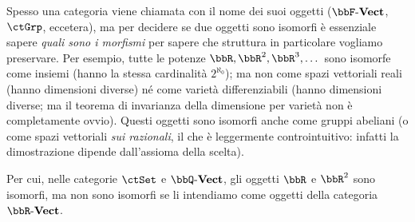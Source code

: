 \begin{warning}
	Spesso una categoria viene chiamata con il nome dei suoi oggetti (\(\ctVect\), \(\ctGrp\), eccetera), ma per decidere se due oggetti sono isomorfi è essenziale sapere \emph{quali sono i morfismi} per sapere che struttura in particolare vogliamo preservare. Per esempio, tutte le potenze \(\bbR,\bbR^2,\bbR^3,\dots\) sono isomorfe come insiemi (hanno la stessa cardinalità \(2^{\aleph_0}\)); ma non come spazi vettoriali reali (hanno dimensioni diverse) né come varietà differenziabili (hanno dimensioni diverse; ma il teorema di invarianza della dimensione per varietà non è completamente ovvio). Questi oggetti sono isomorfi anche come gruppi abeliani (o come spazi vettoriali \emph{sui razionali}, il che è leggermente controintuitivo: infatti la dimostrazione dipende dall'assioma della scelta).

	Per cui, nelle categorie \(\ctSet\) e \(\ctVect[\bbQ]\), gli oggetti \(\bbR\) e \(\bbR^2\) sono isomorfi, ma non sono isomorfi se li intendiamo come oggetti della categoria \(\ctVect[\bbR]\).
\end{warning}

